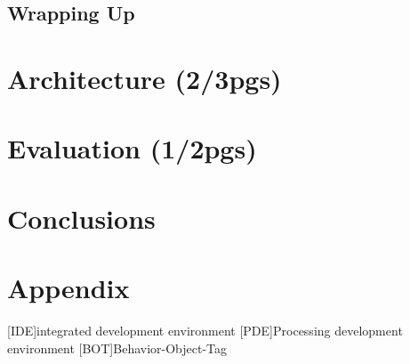 \documentclass{./llncs2e/llncs}
\begin{document}
\subsection{Wrapping Up}

\section{Architecture (2/3pgs)}

\section{Evaluation (1/2pgs)}

\section{Conclusions}

\newpage
\appendix
\section{Appendix}
\label{sec:attachments}

\begin{acronym}
[IDE]{integrated development environment}
[PDE]{Processing development environment}
[BOT]{Behavior-Object-Tag}
\end{acronym}

% 
% 
 

 
\end{document}

